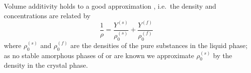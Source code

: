 \documentclass[11pt,twoside]{report}
\begin{document}
Volume additivity holds to a good approximation \cite{HandscombCES2009}, i.e.\ the density and concentrations are related by
\begin{equation}\label{eq:volume-additivity}
  \frac{1}{\rho} =
  \frac{Y^{(s)}}{\rho_0^{(s)}} + \frac{Y^{(f)}}{\rho_0^{(f)}}
\end{equation}
where $\rho_0^{(s)}$ and $\rho_0^{(f)}$ are the densities of the pure substances in the liquid phase; as no stable amorphous phases of  or  are known we approximate $\rho_0^{(s)}$ by the density in the crystal phase.
\end{document}
